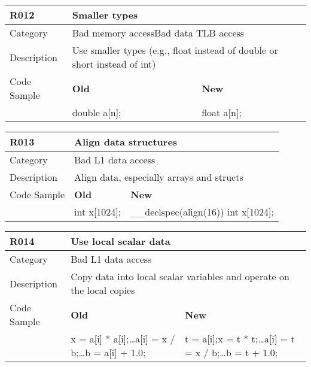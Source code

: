\begin{tabular}{|p{0.9in}|p{2.0in}|p{2.0in}|} \hline
\textbf{R012}       & \multicolumn{2}{|p{4.0in}|}{\textbf{Smaller types}} \\ \hline
Category            & \multicolumn{2}{|p{4.0in}|}{Bad memory access\newline Bad data TLB access} \\ \hline
Description         & \multicolumn{2}{|p{4.0in}|}{Use smaller types (e.g., float instead of double or short instead of int) } \\ \hline
Code Sample         & \textbf{Old} & \textbf{New} \\ \hline
                    & double a[n]; & float a[n]; \\ \hline
\end{tabular}

\begin{tabular}{|p{0.9in}|p{2.0in}|p{2.0in}|} \hline
\textbf{R013}       & \multicolumn{2}{|p{4.0in}|}{\textbf{Align data structures}} \\ \hline
Category            & \multicolumn{2}{|p{4.0in}|}{Bad L1 data access} \\ \hline
Description         & \multicolumn{2}{|p{4.0in}|}{Align data, especially arrays and structs} \\ \hline
Code Sample         & \textbf{Old} & \textbf{New} \\ \hline
                    & int x[1024]; & \_\_declspec(align(16)) int x[1024]; \\ \hline
\end{tabular}

\begin{tabular}{|p{0.9in}|p{2.0in}|p{2.0in}|} \hline
\textbf{R014}       & \multicolumn{2}{|p{4.0in}|}{\textbf{Use local scalar data}} \\ \hline
Category            & \multicolumn{2}{|p{4.0in}|}{Bad L1 data access} \\ \hline
Description         & \multicolumn{2}{|p{4.0in}|}{Copy data into local scalar variables and operate on the local copies} \\ \hline
Code Sample         & \textbf{Old} & \textbf{New} \\ \hline
                    & x = a[i] * a[i];\newline \ldots\newline a[i] = x / b;\newline \ldots\newline b = a[i] + 1.0;\newline
                    & t = a[i];\newline x = t * t;\newline \ldots\newline a[i] = t = x / b;\newline \ldots\newline b = t + 1.0; \\ \hline
\end{tabular}

